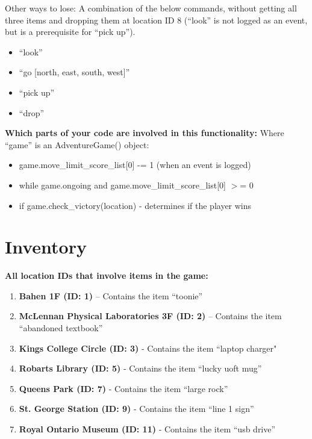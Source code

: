 \documentclass[11pt]{article}
\begin{document}
Other ways to lose: A combination of the below commands, without getting all three items and dropping them at location ID 8 (``look'' is not logged as an event, but is a prerequisite for ``pick up'').
\begin{itemize}
    \item ``look''
    \item ``go [north, east, south, west]''
    \item ``pick up''
    \item ``drop'' \\
\end{itemize}

\textbf{Which parts of your code are involved in this functionality:}
Where ``game'' is an AdventureGame() object:
\begin{itemize}
    \item game.move\_limit\_score\_list[0] -= 1 (when an event is logged)
    \item while game.ongoing and game.move\_limit\_score\_list[0] \(>\)= 0
    \item if game.check\_victory(location) -\> determines if the player wins
\end{itemize}



\section*{Inventory}

\textbf{All location IDs that involve items in the game:\\}
\begin{enumerate}
    \item \textbf{Bahen 1F (ID: 1)} – Contains the item ``toonie''
    \item \textbf{McLennan Physical Laboratories 3F (ID: 2)} – Contains the item ``abandoned textbook''
    \item \textbf{Kings College Circle (ID: 3)} - Contains the item ``laptop charger"
    \item \textbf{Robarts Library (ID: 5)} - Contains the item ``lucky uoft mug''
    \item \textbf{Queens Park (ID: 7)} - Contains the item ``large rock''
    \item \textbf{St. George Station (ID: 9)} - Contains the item ``line 1 sign''
    \item \textbf{Royal Ontario Museum (ID: 11)} - Contains the item ``usb drive''\\
\end{enumerate}
\end{document}
